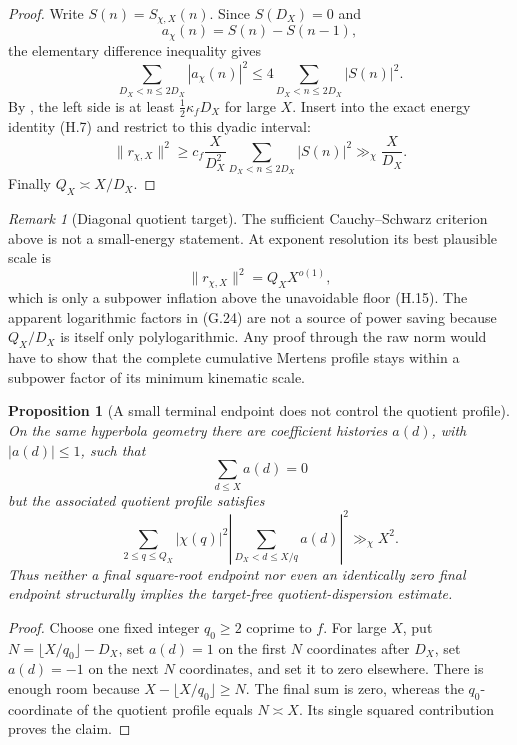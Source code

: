\documentclass[11pt]{article}
\newtheorem{proposition}[theorem]{Proposition}
\theoremstyle{definition}
\theoremstyle{remark}
\newtheorem{remark}[theorem]{Remark}
\begin{document}
\begin{proof}
Write \(S(n)=S_{\chi,X}(n)\).  Since \(S(D_X)=0\) and
\[
 a_\chi(n)=S(n)-S(n-1),
\]
the elementary difference inequality gives
\[
 \sum_{D_X<n\le2D_X}|a_\chi(n)|^2
 \le4\sum_{D_X<n\le2D_X}|S(n)|^2.
 \tag{H.16}
\]
By , the left side is at least
\(\frac12\kappa_fD_X\) for large \(X\).  Insert
 into the exact energy identity
\textup{(H.7)} and restrict to this dyadic interval:
\[
 \|r_{\chi,X}\|^2
 \ge c_f\frac{X}{D_X^2}
       \sum_{D_X<n\le2D_X}|S(n)|^2
 \gg_\chi\frac{X}{D_X}.
\]
Finally \(Q_X\asymp X/D_X\).
\end{proof}

\begin{remark}[Diagonal quotient target]
The sufficient Cauchy--Schwarz criterion above is not a small-energy
statement.  At exponent resolution its best plausible scale is
\[
 \boxed{
 \|r_{\chi,X}\|^2=Q_XX^{o(1)},}
 \tag{H.17}
\]
which is only a subpower inflation above the unavoidable floor
\textup{(H.15)}.  The apparent logarithmic factors in \textup{(G.24)} are not a
source of power saving because \(Q_X/D_X\) is itself only polylogarithmic.
Any proof through the raw norm would have to show that the complete cumulative
Mertens profile stays within a subpower factor of its minimum kinematic scale.
\end{remark}

\begin{proposition}[A small terminal endpoint does not control the quotient profile]
\label{cth:hyperbola-endpoint-profile-no-go}
On the same hyperbola geometry there are coefficient histories
\(a(d)\), with \(|a(d)|\le1\), such that
\[
 \sum_{d\le X}a(d)=0
 \tag{H.18}
\]
but the associated quotient profile satisfies
\[
 \boxed{
 \sum_{2\le q\le Q_X}|\chi(q)|^2
 \left|\sum_{D_X<d\le X/q}a(d)\right|^2
 \gg_\chi X^2.}
 \tag{H.19}
\]
Thus neither a final square-root endpoint nor even an identically zero final
endpoint structurally implies the target-free quotient-dispersion estimate.
\end{proposition}

\begin{proof}
Choose one fixed integer \(q_0\ge2\) coprime to \(f\).  For large \(X\), put
\(N=\lfloor X/q_0\rfloor-D_X\), set \(a(d)=1\) on the first \(N\)
coordinates after \(D_X\), set \(a(d)=-1\) on the next \(N\) coordinates,
and set it to zero elsewhere.  There is enough room because
\(X-\lfloor X/q_0\rfloor\ge N\).  The final sum is zero, whereas the
\(q_0\)-coordinate of the quotient profile equals \(N\asymp X\).  Its single
squared contribution proves the claim.
\end{proof}
\end{document}
